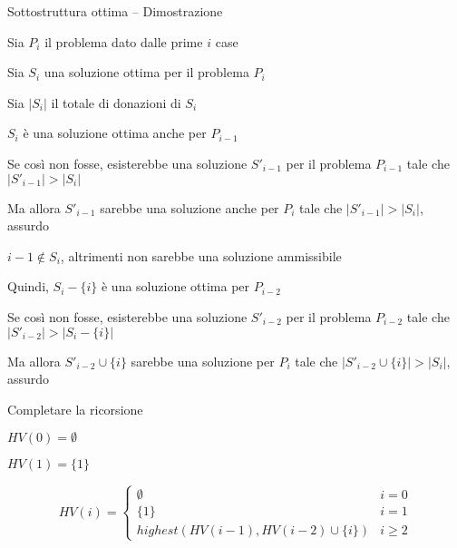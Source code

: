 \begin{frame}{Sottostruttura ottima -- Dimostrazione}

\BI
\item Sia $P_i$ il problema dato dalle prime $i$ case
\item Sia $S_i$ una soluzione ottima per il problema $P_i$
\item Sia $|S_i|$ il totale di donazioni di $S_i$
\EI

\begin{overprint}
\BIL
\item $S_i$ è una soluzione ottima anche per $P_{i-1}$
\item Se così non fosse, esisterebbe una soluzione $S'_{i-1}$ per il
problema $P_{i-1}$ tale che $|S'_{i-1}|>|S_i|$
\item Ma allora $S'_{i-1}$ sarebbe una soluzione anche per $P_i$ tale
che $|S'_{i-1}|>|S_i|$, assurdo
\EIL
{}
\BIL
\item $i-1 \not\in S_i$, altrimenti non sarebbe una soluzione ammissibile
\item Quindi, $S_i-\{i\}$ è una soluzione ottima per $P_{i-2}$
\item Se così non fosse, esisterebbe una soluzione $S'_{i-2}$ per il
problema $P_{i-2}$ tale che $|S'_{i-2}|>|S_i-\{i\}|$
\item Ma allora $S'_{i-2} \cup \{i \}$ sarebbe una soluzione per $P_i$
tale che $|S'_{i-2} \cup \{i\}|>|S_i|$, assurdo
\EIL
\end{overprint}


\end{frame}



\begin{frame}{Completare la ricorsione}

\vspace{-9pt}
\pause
\BIL
\item $HV(0) = \emptyset$
\item $HV(1) = \{ 1 \}$
\EIL


\[
HV(i) = \begin{cases}
  \emptyset & i=0 \\
  \{ 1 \} & i=1 \\
  \mathit{highest}(HV(i-1), HV(i-2) \cup \{ i \}) & i \geq 2
  \end{cases}
\]

\end{frame}

